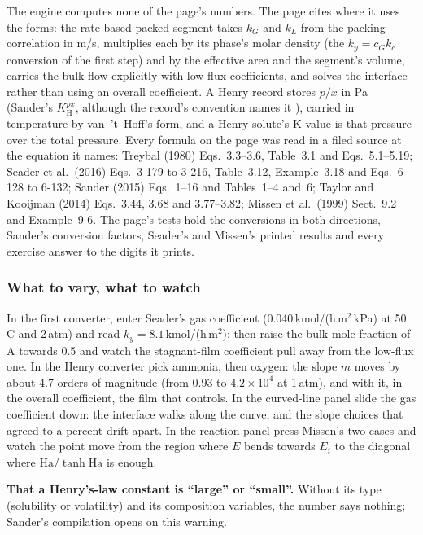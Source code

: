 \documentclass[11pt,a4paper]{article}
\begin{document}
The engine computes none of the page's numbers.  The page cites where it uses
the forms: the rate-based packed segment takes $k_G$ and $k_L$ from the packing
correlation in m/s, multiplies each by its phase's molar density (the $k_y =
c_G k_c$ conversion of the first step) and by the effective area and the
segment's volume, carries the bulk flow explicitly with low-flux coefficients,
and solves the interface rather than using an overall coefficient.  A Henry
record stores $p/x$ in Pa (Sander's $K_\mathrm{H}^{px}$, although the record's
convention names it ), carried in temperature by van~'t~Hoff's form,
and a Henry solute's K-value is that pressure over the total pressure.  Every
formula on the page was read in a filed source at the equation it names:
Treybal (1980) Eqs.~3.3--3.6, Table~3.1 and Eqs.~5.1--5.19; Seader et
al.\ (2016) Eqs.~3-179 to 3-216, Table~3.12, Example~3.18 and Eqs.~6-128 to
6-132; Sander (2015) Eqs.~1--16 and Tables~1--4 and~6; Taylor and Kooijman
(2014) Eqs.~3.44, 3.68 and 3.77--3.82; Missen et al.\ (1999) Sect.~9.2 and
Example~9-6.  The page's tests hold the conversions in both directions, Sander's
conversion factors, Seader's and Missen's printed results and every exercise
answer to the digits it prints.

\subsubsection*{What to vary, what to watch}

\begin{tryit}
In the first converter, enter Seader's gas coefficient (0.040\,kmol/(h\,m$^2$\,kPa)
at 50\,\textdegree C and 2\,atm) and read $k_y = 8.1$\,kmol/(h\,m$^2$); then
raise the bulk mole fraction of A towards 0.5 and watch the stagnant-film
coefficient pull away from the low-flux one.  In the Henry converter pick
ammonia, then oxygen: the slope $m$ moves by about 4.7 orders of magnitude (from 0.93 to $4.2\times10^4$ at 1\,atm), and with
it, in the overall coefficient, the film that controls.  In the curved-line
panel slide the gas coefficient down: the interface walks along the curve, and
the slope choices that agreed to a percent drift apart.  In the reaction panel
press Missen's two cases and watch the point move from the region where $E$
bends towards $E_i$ to the diagonal where $\mathrm{Ha}/\tanh\mathrm{Ha}$ is enough.
\end{tryit}

\begin{pitfall}
\textbf{That a Henry's-law constant is ``large'' or ``small''.}  Without its
type (solubility or volatility) and its composition variables, the number says
nothing; Sander's compilation opens on this warning.
\end{pitfall}
\end{document}
